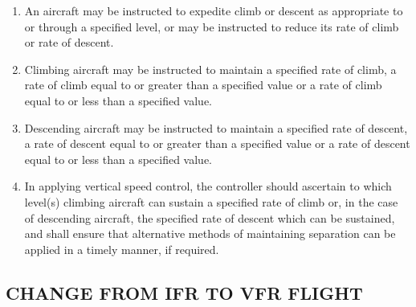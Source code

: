 \documentclass[../vATM.tex]{subfiles}
\begin{document}
    \begin{enumerate}
        \item An aircraft may be instructed to expedite climb or descent as appropriate to or through a specified level, or may be instructed to reduce its rate of climb or rate of descent.
        \item Climbing aircraft may be instructed to maintain a specified rate of climb, a rate of climb equal to or greater than a specified value or a rate of climb equal to or less than a specified value.
        \item Descending aircraft may be instructed to maintain a specified rate of descent, a rate of descent equal to or greater than a specified value or a rate of descent equal to or less than a specified value.
        \item In applying vertical speed control, the controller should ascertain to which level(s) climbing aircraft can sustain a specified rate of climb or, in the case of descending aircraft, the specified rate of descent which can be sustained, and shall ensure that alternative methods of maintaining separation can be applied in a timely manner, if required.

    \end{enumerate}

    \subsection[Change from IFR to VFR flight]{CHANGE FROM IFR TO VFR FLIGHT}
\end{document}

